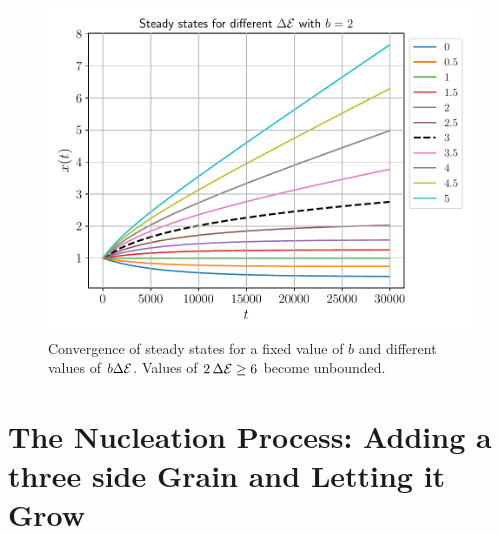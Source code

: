 \begin{figure}
    \centering
    \includegraphics[scale=0.6]{figures/stored_energy/SE_experiments.pdf}
    \caption[Convergence of steady states for a fixed value of $b$ and different values of $b \Delta \SE$]{Convergence of steady states for a fixed value of $b$ and different values of $b \Delta \SE$. Values of $2\,\Delta \mathcal{E} \geq 6$ become unbounded.}
    \label{fig:SE_experiments}
\end{figure}

\section{The Nucleation Process: Adding a three side Grain and Letting it Grow}
\label{sec:nucleation}

